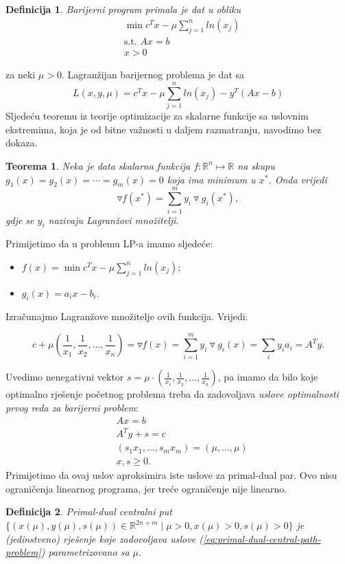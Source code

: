 \documentclass[a4paper, utf8, 11pt, colorlinks]{book}
\newtheorem{definition}{Definicija}
\newtheorem{thm}{Teorema}
\begin{document}
\begin{definition}
	Barijerni program  primala je dat u obliku 
	\begin{align*}
		&\min c^T x - \mu \sum_{j=1}^n ln(x_j) \\
		&\mbox{s.t. } A x = b \\
		& x > 0
	\end{align*}
\end{definition}
za neki $\mu >0$. Lagranžijan barijernog problema je dat sa 
$$  L(x, y, \mu) = c^T x - \mu \sum_{j=1}^n ln(x_j)  - y^T(Ax - b) $$
Sljedeću teoremu iz teorije optimizacije  za skalarne funkcije sa uslovnim ekstremima, koja je od bitne važnosti u daljem razmatranju, navodimo   bez dokaza. 
\begin{thm}
	Neka je data skalarna funkcija  $f:\mathbb{R}^n \mapsto \mathbb{R}$ na skupu $g_1(x)=g_2(x)= \cdots = g_m(x) =0$ koja ima minimum u $x^*$. Onda vrijedi 
	$$ \triangledown f (x^*) = \sum_{i=1}^m y_i \triangledown g_i(x^*),$$
	gdje se $y_i$ nazivaju Lagranžovi množitelji. 
\end{thm}

Primijetimo da u problemu LP-a imamo sljedeće:
\begin{itemize}
	\item $f(x) = \min c^T x - \mu \sum_{j=1}^n ln(x_j) $;
	\item $g_i(x) = a_i x - b_i$.
\end{itemize}
Izračunajmo Lagranžove množitelje ovih funkcija. Vrijedi:

$$c + \mu (\frac{1}{x_1}, \frac{1}{x_2}, \ldots, \frac{1}{x_n}) = \triangledown f (x) =\sum_{i=1}^m y_i \triangledown g_i(x) = \sum_{i} y_i a_i = A^T y.$$ 

Uvedimo nenegativni vektor $s =\mu \cdot (\frac{1}{x_1}, \frac{1}{x_2}, \ldots, \frac{1}{x_n})$, pa imamo da bilo koje optimalno rješenje početnog problema treba da zadovoljava \emph{uslove optimalnosti prvog reda za barijerni problem}:
\begin{align}
	&A x = b \nonumber \\
	&A^T y + s = c  \nonumber \\
	& (s_1 x_1, \ldots, s_m x_m) = (\mu, \ldots, \mu) \label{eq:primal-dual-central-path-problem} \\
	& x, s \geq 0. \nonumber
\end{align}
Primijetimo da ovaj uslov aproksimira iste uslove za primal-dual par. 
Ovo nisu ograničenja linearnog programa, jer treće ograničenje  nije linearno.

\begin{definition}
	Primal-dual centralni put $\{(x(\mu), y(\mu), s(\mu)) \in \mathbb{R}^{2n + m} \mid \mu > 0, x(\mu) >0, s(\mu)>0 \}$ je (jedinstveno) rješenje koje zadovoljava uslove (\ref{eq:primal-dual-central-path-problem}) parametrizovano sa $\mu$. 
\end{definition}
\end{document}
